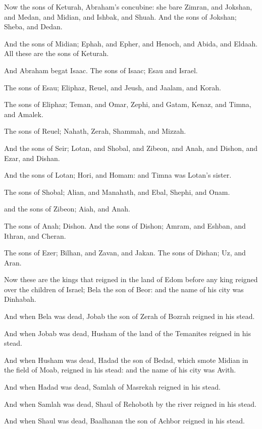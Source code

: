 \verse Now the sons of Keturah, Abraham's concubine: she bare Zimran, and Jokshan, and Medan, and Midian, and Ishbak, and Shuah. And the sons of Jokshan; Sheba, and Dedan.

\verse And the sons of Midian; Ephah, and Epher, and Henoch, and Abida, and Eldaah. All these are the sons of Keturah.

\verse And Abraham begat Isaac. The sons of Isaac; Esau and Israel.

\verse The sons of Esau; Eliphaz, Reuel, and Jeush, and Jaalam, and Korah.

\verse The sons of Eliphaz; Teman, and Omar, Zephi, and Gatam, Kenaz, and Timna, and Amalek.

\verse The sons of Reuel; Nahath, Zerah, Shammah, and Mizzah.

\verse And the sons of Seir; Lotan, and Shobal, and Zibeon, and Anah, and Dishon, and Ezar, and Dishan.

\verse And the sons of Lotan; Hori, and Homam: and Timna was Lotan's sister.

\verse The sons of Shobal; Alian, and Manahath, and Ebal, Shephi, and Onam.

and the sons of Zibeon; Aiah, and Anah.

\verse The sons of Anah; Dishon. And the sons of Dishon; Amram, and Eshban, and Ithran, and Cheran.

\verse The sons of Ezer; Bilhan, and Zavan, and Jakan. The sons of Dishan; Uz, and Aran.

\verse Now these are the kings that reigned in the land of Edom before any king reigned over the children of Israel; Bela the son of Beor: and the name of his city was Dinhabah.

\verse And when Bela was dead, Jobab the son of Zerah of Bozrah reigned in his stead.

\verse And when Jobab was dead, Husham of the land of the Temanites reigned in his stead.

\verse And when Husham was dead, Hadad the son of Bedad, which smote Midian in the field of Moab, reigned in his stead: and the name of his city was Avith.

\verse And when Hadad was dead, Samlah of Masrekah reigned in his stead.

\verse And when Samlah was dead, Shaul of Rehoboth by the river reigned in his stead.

\verse And when Shaul was dead, Baalhanan the son of Achbor reigned in his stead.

